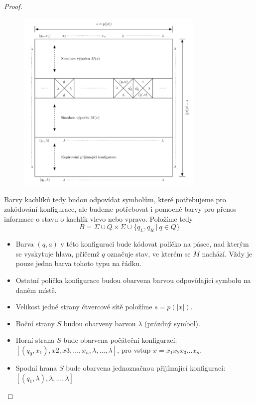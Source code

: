 \documentclass[11pt]{report} %
\begin{document}
\begin{proof}
\begin{figure}[H]
	\label{kachl_overview}
	\centering
	\includegraphics[width=0.8\textwidth]{img/kachl_overview.png}
\end{figure}

Barvy kachlíků tedy budou odpovídat symbolům, které potřebujeme pro zakódování konfigurace, ale budeme potřebovat i pomocné barvy pro přenos informace o stavu o kachlík vlevo nebo vpravo. Položíme tedy
$$ B = \Sigma \cup Q \times \Sigma \cup \{q_L, q_R\ |\ q \in Q\}$$

\begin{itemize}
	\leftskip 20pt
	\setlength{\itemsep}{0pt}
	\item Barva $(q, a)$ v této konfiguraci bude kódovat políčko na pásce, nad kterým se vyskytuje hlava, přičemž $q$ označuje stav, ve kterém se $M$ nachází. Vždy je pouze jedna barva tohoto typu na řádku.
	\item Ostatní políčka konfigurace budou obarvena barvou odpovídající symbolu na daném místě.
	\item Velikost jedné strany čtvercové sítě položíme $s = p(|x|)$.
	\item Boční strany $S$ budou obarveny barvou $\lambda$ (prázdný symbol).
	\item Horní strana $S$ bude obarvena počáteční konfigurací: $[(q_0, x_1), x2, x3, \dots, x_n, \lambda, \dots,\lambda]$, pro vstup $x = x_1x_2x_3\dots x_n$.
	\item Spodní hrana $S$ bude obarvena jednoznačnou přijímající konfigurací: $[(q_1, \lambda), \lambda, \dots, \lambda]$
\end{itemize}


\end{proof}
\end{document}
